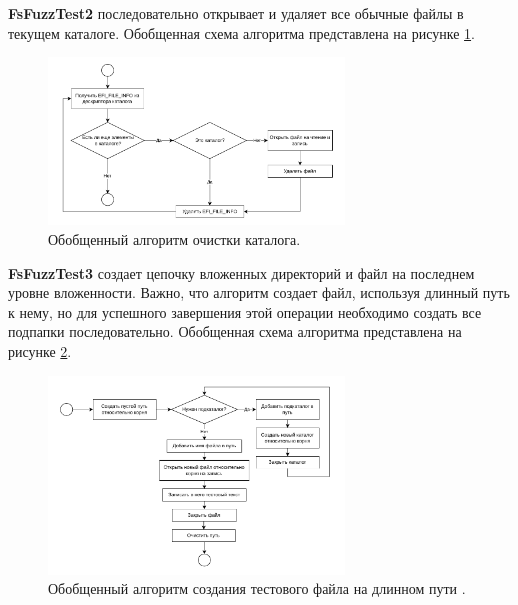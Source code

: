 \textbf{FsFuzzTest2} последовательно открывает и удаляет все обычные файлы в текущем каталоге. Обобщенная схема алгоритма представлена на рисунке \ref{met:pic:fsfuzztestii}. 
\begin{figure}[htbp]
	\centering %
	\includegraphics[width=0.7\textwidth]{FsFuzzTestII.pdf} %
	\caption{Обобщенный алгоритм очистки каталога.} %
	\label{met:pic:fsfuzztestii} %
\end{figure}

\textbf{FsFuzzTest3} создает цепочку вложенных директорий и файл на последнем уровне вложенности. Важно, что алгоритм создает файл, используя длинный путь к нему, но для успешного завершения этой операции необходимо создать все подпапки последовательно. Обобщенная схема алгоритма представлена на рисунке \ref{met:pic:fsfuzztestiii}.
\begin{figure}[h]
	\centering %
	\includegraphics[width=0.7\textwidth]{FsFuzzTestIII.pdf} %
	\caption{Обобщенный алгоритм создания тестового файла на длинном пути .} %
	\label{met:pic:fsfuzztestiii} %
\end{figure}


